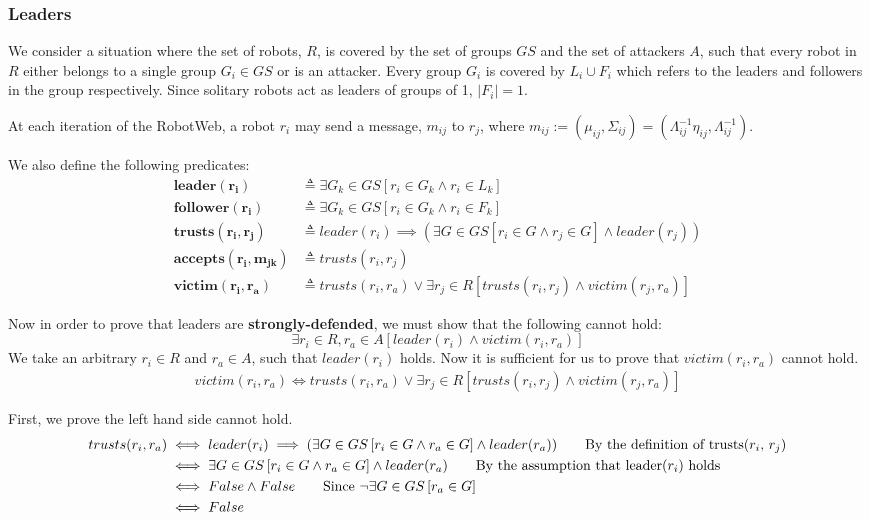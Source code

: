 \subsubsection{Leaders}
We consider a situation where the set of robots, $R$, is covered by the set of groups $GS$ and the set of attackers $A$, such that every robot in $R$ either belongs to a single group $G_i \in GS$ or is an attacker. Every group $G_i$ is covered by $L_i \cup F_i$ which refers to the leaders and followers in the group respectively. Since solitary robots act as leaders of groups of 1, $|F_i| = 1$.

At each iteration of the RobotWeb, a robot $r_i$ may send a message, $m_{ij}$ to $r_j$, where $m_{ij} := (\mu_{ij}, \Sigma_{ij}) = (\Lambda_{ij}^{-1}\eta_{ij}, \Lambda_{ij}^{-1})$.

We also define the following predicates:
\begin{align*}
    \mathbf{leader(r_i)} &\triangleq \exists{G_k \in GS}\left[r_i \in G_k \land r_i \in L_k\right]\\
    \mathbf{follower(r_i)} &\triangleq \exists{G_k \in GS}\left[r_i \in G_k \land r_i \in F_k\right]\\
    \mathbf{trusts(r_i, r_j)} &\triangleq leader(r_i) \implies (\exists{G \in GS}\left[r_i \in G \land r_j \in G\right] \land leader(r_j))\\
    \mathbf{accepts(r_i, m_{jk})} &\triangleq trusts(r_i, r_j)\\
    \mathbf{victim(r_i, r_a)} &\triangleq trusts(r_i, r_a) \lor \exists r_j \in R\left[trusts(r_i, r_j) \land victim(r_j, r_a)\right]
\end{align*}

Now in order to prove that leaders are \textbf{strongly-defended}, we must show that the following cannot hold:
\begin{equation}
    \exists r_i\in R, r_a \in A\left[leader(r_i) \land victim(r_i, r_a)\right]
\end{equation}
We take an arbitrary $r_i \in R$ and $r_a \in A$, such that $leader(r_i)$ holds. Now it is sufficient for us to prove that $victim(r_i, r_a)$ cannot hold.
\begin{align*}
    victim(r_i, r_a) \iff trusts(r_i, r_a) \lor \exists r_j \in R\left[trusts(r_i, r_j) \land victim(r_j, r_a)\right]
\end{align*}

First, we prove the left hand side cannot hold.
\begin{align*}
    trusts(r_i, r_a) &\iff leader(r_i) \implies (\exists{G \in GS}\left[r_i \in G \land r_a \in G\right] \land leader(r_a)) \tag*{\text{By the definition of trusts($r_i$, $r_j$)}}\\
    &\iff \exists{G \in GS}\left[r_i \in G \land r_a \in G\right] \land leader(r_a) \tag*{\text{By the assumption that leader($r_i$) holds}}\\\
    &\iff False \land False \tag*{\text{Since $\neg \exists G\in GS\left[r_a\in G\right]$}}\\
    &\iff False
\end{align*}

